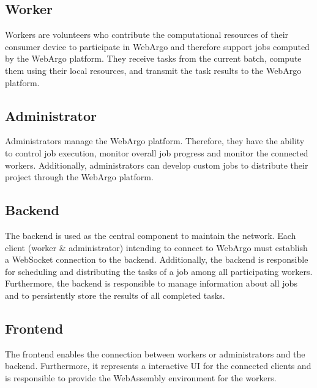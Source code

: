 \subsection{Worker}
\label{subsec:concept:worker}
Workers are volunteers who contribute the computational resources of their consumer device to participate in WebArgo and therefore support jobs computed by the WebArgo platform. They receive tasks from the current batch, compute them using their local resources, and transmit the task results to the WebArgo platform.

\subsection{Administrator}
\label{ssubsec:concept:admin}
Administrators manage the WebArgo platform. Therefore, they have the ability to control job execution, monitor overall job progress and monitor the connected workers. Additionally, administrators can develop custom jobs to distribute their project through the WebArgo platform.

\subsection{Backend}
\label{subsec:concept:backend}
The backend is used as the central component to maintain the network. Each client (worker \& administrator) intending to connect to WebArgo must establish a WebSocket connection to the backend. Additionally, the backend is responsible for scheduling and distributing the tasks of a job among all participating workers. Furthermore, the backend is responsible to manage information about all jobs and to persistently store the results of all completed tasks.

\subsection{Frontend}
\label{subsec:concept:frontend}
The frontend enables the connection between workers or administrators and the backend. Furthermore, it represents a interactive \ac{UI} for the connected clients and is responsible to provide the WebAssembly environment for the workers.

